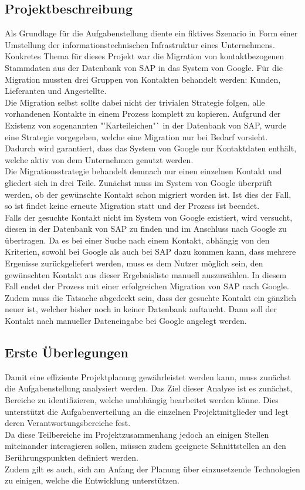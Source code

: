 \subsection{Projektbeschreibung}
Als Grundlage für die Aufgabenstellung diente ein fiktives Szenario in Form einer Umstellung der informationstechnischen Infrastruktur eines Unternehmens. Konkretes Thema für dieses Projekt war die Migration von kontaktbezogenen Stammdaten aus der Datenbank von SAP in das System von Google. Für die Migration mussten drei Gruppen von Kontakten behandelt werden: Kunden, Lieferanten und Angestellte.\\
Die Migration selbst sollte dabei nicht der trivialen Strategie folgen, alle vorhandenen Kontakte in einem Prozess komplett zu kopieren. Aufgrund der Existenz von sogenannten "'Karteileichen"` in der Datenbank von SAP, wurde eine Strategie vorgegeben, welche eine Migration nur bei Bedarf vorsieht. Dadurch wird garantiert, dass das System von Google nur Kontaktdaten enthält, welche aktiv von dem Unternehmen genutzt werden.\\
Die Migrationsstrategie behandelt demnach nur einen einzelnen Kontakt und gliedert sich in drei Teile. Zunächst muss im System von Google überprüft werden, ob der gewünschte Kontakt schon migriert worden ist. Ist dies der Fall, so ist findet keine erneute Migration statt und der Prozess ist beendet.\\
Falls der gesuchte Kontakt nicht im System von Google existiert, wird versucht, diesen in der Datenbank von SAP zu finden und im Anschluss nach Google zu übertragen. Da es bei einer Suche nach einem Kontakt, abhängig von den Kriterien, sowohl bei Google als auch bei SAP dazu kommen kann, dass mehrere Ergenisse zurückgeliefert werden, muss es dem Nutzer möglich sein, den gewünschten Kontakt aus dieser Ergebnisliste manuell auszuwählen. In diesem Fall endet der Prozess mit einer erfolgreichen Migration von SAP nach Google.\\
Zudem muss die Tatsache abgedeckt sein, dass der gesuchte Kontakt ein gänzlich neuer ist, welcher bisher noch in keiner Datenbank auftaucht. Dann soll der Kontakt nach manueller Dateneingabe bei Google angelegt werden.

\subsection{Erste Überlegungen}
Damit eine effiziente Projektplanung gewährleistet werden kann, muss zunächst die Aufgabenstellung analysiert werden. Das Ziel dieser Analyse ist es zunächst, Bereiche zu identifizieren, welche unabhängig bearbeitet werden könne. Dies unterstützt die Aufgabenverteilung an die einzelnen Projektmitglieder und legt deren Verantwortungsbereiche fest.\\
Da diese Teilbereiche im Projektzusammenhang jedoch an einigen Stellen miteinander interagieren sollen, müssen zudem geeignete Schnittstellen an den Berührungspunkten definiert werden.\\
Zudem gilt es auch, sich am Anfang der Planung über einzusetzende Technologien zu einigen, welche die Entwicklung unterstützen.

